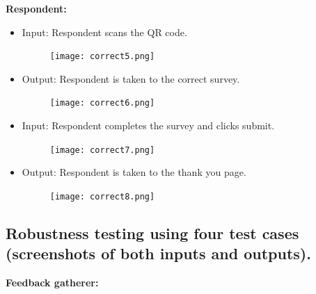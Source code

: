 \documentclass[letterpaper, 12 pt, conference]{ieeeconf}
\begin{document}
\hfill \break
\clearpage
\textbf{Respondent:}
\begin{itemize}
    \item[] Input: Respondent scans the QR code.
    \begin{figure}[h]
        \centering
        \texttt{[image: correct5.png]}
\end{figure}

    \item[] Output: Respondent is taken to the correct survey.
    \begin{figure}[h]
        \centering
        \texttt{[image: correct6.png]}
\end{figure}
\clearpage
    \item[] Input: Respondent completes the survey and clicks submit.
    \begin{figure}[h]
        \centering
        \texttt{[image: correct7.png]}
\end{figure}

    \item[] Output: Respondent is taken to the thank you page.
    \begin{figure}[h]
        \centering
        \texttt{[image: correct8.png]}
\end{figure}
\end{itemize}

\newpage

\subsection{Robustness testing using four test cases (screenshots of both inputs and outputs).}
\newline

\textbf{Feedback gatherer:}
\end{document}
